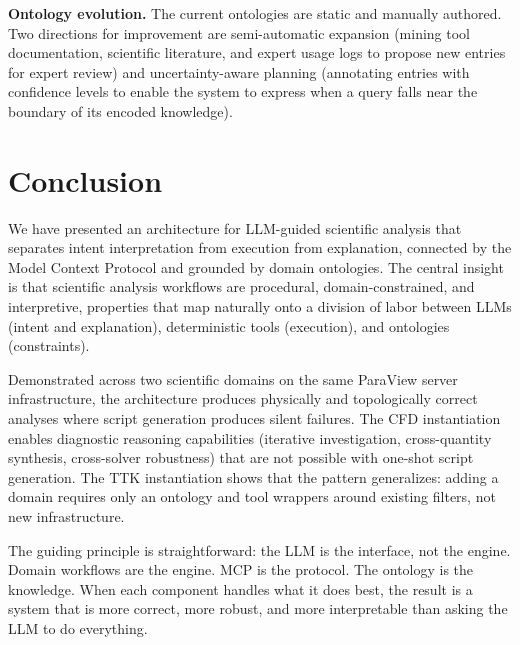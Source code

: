 \documentclass{vgtc}                          %
\begin{document}
\textbf{Ontology evolution.}
The current ontologies are static and manually authored.
Two directions for improvement are semi-automatic expansion (mining tool
documentation, scientific literature, and expert usage logs to propose new
entries for expert review) and uncertainty-aware planning (annotating entries
with confidence levels to enable the system to express when a query falls near
the boundary of its encoded knowledge).


\section{Conclusion}

We have presented an architecture for LLM-guided scientific analysis that
separates intent interpretation from execution from explanation, connected by
the Model Context Protocol and grounded by domain ontologies.
The central insight is that scientific analysis workflows are procedural,
domain-constrained, and interpretive, properties that map naturally onto a
division of labor between LLMs (intent and explanation), deterministic tools
(execution), and ontologies (constraints).

Demonstrated across two scientific domains on the same ParaView server
infrastructure, the architecture produces physically and topologically correct
analyses where script generation produces silent failures.
The CFD instantiation enables diagnostic reasoning capabilities (iterative
investigation, cross-quantity synthesis, cross-solver robustness) that are not
possible with one-shot script generation.
The TTK instantiation shows that the pattern generalizes: adding a domain
requires only an ontology and tool wrappers around existing filters, not new
infrastructure.

The guiding principle is straightforward: the LLM is the interface, not the
engine.
Domain workflows are the engine.
MCP is the protocol.
The ontology is the knowledge.
When each component handles what it does best, the result is a system that is
more correct, more robust, and more interpretable than asking the LLM to do
everything.



%

%
%
%


\end{document}
